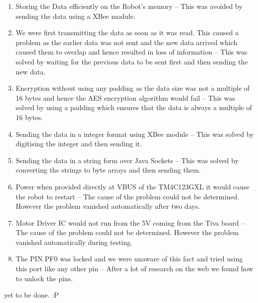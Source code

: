 \documentclass[a4paper,12pt,oneside]{book}
\begin{document}
\begin{enumerate}

\item Storing the Data efficiently on the Robot's memory -- This was avoided by sending the data using a XBee module.
\item We were first transmitting the data as soon as it was read. This caused a problem as the earlier data was not sent and the new data arrived which caused them to overlap and hence resulted in loss of information -- This was solved by waiting for the previous data to be sent first and then sending the new data.
\item Encryption without using any padding as the data size was not a multiple of 16 bytes and hence the AES encryption algorithm would fail -- This was solved by using a padding which ensures that the data is always a multiple of 16 bytes.
\item Sending the data in a integer format using XBee module -- This was solved by digitising the integer and then sending it.
\item Sending the data in a string form over Java Sockets -- This was solved by converting the strings to byte arrays and then sending them.
\item Power when provided directly at VBUS of the TM4C123GXL it would cause the robot to restart -- The cause of the problem could not be determined. However the problem vanished automatically after two days.
\item Motor Driver IC would not run from the 5V coming from the Tiva board -- The cause of the problem could not be determined. However the problem vanished automatically during testing.
\item The PIN PF0 was locked and we were unaware of this fact and tried using this port like any other pin -- After a lot of research on the web we found how to unlock the pins.

\end{enumerate}


\begin{thebibliography}{li}

yet to be done. :P

\end{thebibliography}
\end{document}
